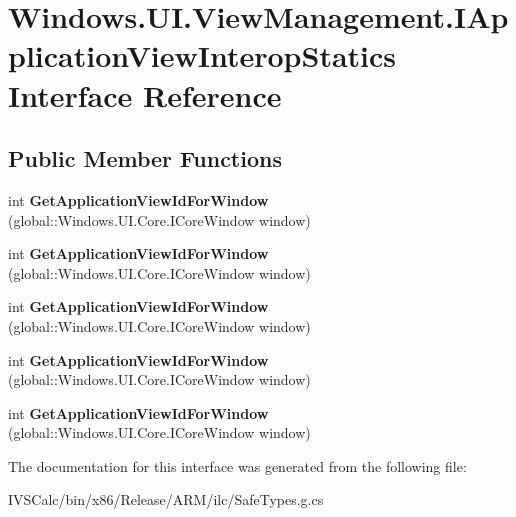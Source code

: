 \hypertarget{interface_windows_1_1_u_i_1_1_view_management_1_1_i_application_view_interop_statics}{}\section{Windows.\+U\+I.\+View\+Management.\+I\+Application\+View\+Interop\+Statics Interface Reference}
\label{interface_windows_1_1_u_i_1_1_view_management_1_1_i_application_view_interop_statics}
\subsection*{Public Member Functions}
\begin{DoxyCompactItemize}
\item 
\mbox{\label{interface_windows_1_1_u_i_1_1_view_management_1_1_i_application_view_interop_statics_ac81e1174ded5fd71c77e221857b4bb85}} 
int {\bfseries Get\+Application\+View\+Id\+For\+Window} (global\+::\+Windows.\+U\+I.\+Core.\+I\+Core\+Window window)
\item 
\mbox{\label{interface_windows_1_1_u_i_1_1_view_management_1_1_i_application_view_interop_statics_ac81e1174ded5fd71c77e221857b4bb85}} 
int {\bfseries Get\+Application\+View\+Id\+For\+Window} (global\+::\+Windows.\+U\+I.\+Core.\+I\+Core\+Window window)
\item 
\mbox{\label{interface_windows_1_1_u_i_1_1_view_management_1_1_i_application_view_interop_statics_ac81e1174ded5fd71c77e221857b4bb85}} 
int {\bfseries Get\+Application\+View\+Id\+For\+Window} (global\+::\+Windows.\+U\+I.\+Core.\+I\+Core\+Window window)
\item 
\mbox{\label{interface_windows_1_1_u_i_1_1_view_management_1_1_i_application_view_interop_statics_ac81e1174ded5fd71c77e221857b4bb85}} 
int {\bfseries Get\+Application\+View\+Id\+For\+Window} (global\+::\+Windows.\+U\+I.\+Core.\+I\+Core\+Window window)
\item 
\mbox{\label{interface_windows_1_1_u_i_1_1_view_management_1_1_i_application_view_interop_statics_ac81e1174ded5fd71c77e221857b4bb85}} 
int {\bfseries Get\+Application\+View\+Id\+For\+Window} (global\+::\+Windows.\+U\+I.\+Core.\+I\+Core\+Window window)
\end{DoxyCompactItemize}


The documentation for this interface was generated from the following file\+:\begin{DoxyCompactItemize}
\item 
I\+V\+S\+Calc/bin/x86/\+Release/\+A\+R\+M/ilc/Safe\+Types.\+g.\+cs\end{DoxyCompactItemize}
